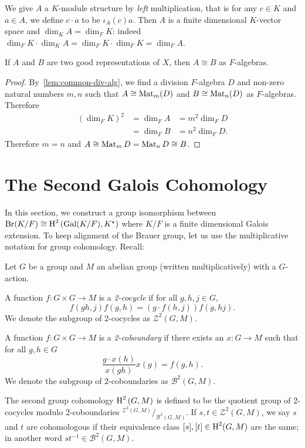 \begin{construction}
  We give $A$ a $K$-module structure by {\em left} multiplication, that is for any $c \in K$ and $a \in A$, we define $c\cdot a$ to be $\iota_{A}(c)a$. Then $A$ is a finite dimensional $K$-vector space and $\dim_{K}A=\dim_{F}K$: indeed $\dim_{F}K\cdot\dim_{K}A = \dim_{F}K\cdot \dim_{F}K = \dim_{F}A$.
  \leanok
\end{construction}

\begin{lemma}\label{lem:good-rep-iso}
  If $A$ and $B$ are two good representations of $X$, then $A \cong B$ as $F$-algebras.
  \leanok
\end{lemma}
\begin{proof}
  By~\cref{lem:common-div-alg}, we find a division $F$-algebra $D$ and non-zero natural numbers $m, n$ such that $A \cong \operatorname{Mat}_{m}(D)$ and $B \cong \operatorname{Mat}_{n}(D)$ as $F$-algebras. Therefore
  \[
    \begin{aligned}
      {\left(\dim_{F}K\right)}^{2} &= \dim_{F}A &= m^{2}\dim_{F}D \\
      &= \dim_{F}B &= n^{2}\dim_{F}D.
    \end{aligned}
  \]
  Therefore $m = n$ and $A \cong \operatorname{Mat}_{m}D =\operatorname{Mat}_{n}D\cong B$.
\end{proof}

\section{The Second Galois Cohomology}

In this section, we construct a group isomorphism between $\operatorname{Br}(K/F) \cong \operatorname{H}^{2}\left(\operatorname{Gal}(K/F), K^{\star}\right)$ where $K/F$ is a finite dimensional Galois extension. To keep alignment of the Brauer group, let us use the multiplicative notation for group cohomology. Recall:

\begin{definition}
  \label{def:second-group-coh}
  Let $G$ be a group and $M$ an abelian group (written multiplicatively) with a $G$-action.

  A function $f : G \times G \to M$ is a {\em 2-cocycle\/} if for all $g,h,j\in G$,
  \[
    f(gh, j)f(g, h) = \left(g\cdot f(h, j)\right) f(g, hj).
  \]
  We denote the subgroup of 2-cocycles as $\mathcal{Z}^{2}(G, M)$.

  A function $f : G\times G \to M$ is a {\em 2-coboundary\/} if there exists an $x : G \to M$ such that for all $g, h \in G$
  \[
    \frac{g\cdot x(h)}{x(gh)} x(g) = f(g, h).
  \]
  We denote the subgroup of 2-coboundaries as $\mathcal{B}^{2}(G, M)$.

  The second group cohomology $\operatorname{H}^{2}\left(G, M\right)$ is defined to be the quotient group of 2-cocycles modulo 2-coboundaries $^{\mathcal{Z}^{2}(G, M)}/_{\mathcal{B}^{2}(G, M)}$. If $s, t \in \mathcal{Z}^{2}(G, M)$, we say $s$ and $t$ are cohomologous if their equivalence class $[s], [t] \in \operatorname{H}^{2}(G, M)$ are the same; in another word $st^{-1}\in\mathcal{B}^{2}(G, M)$.
  \leanok
\end{definition}

